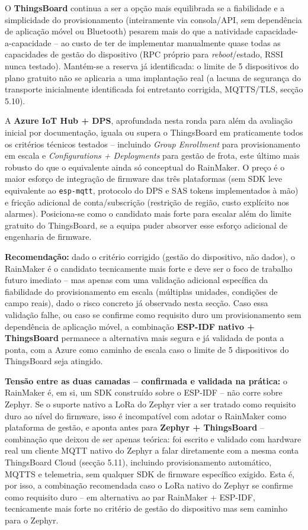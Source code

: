 \documentclass[a4paper,12pt]{article}
\begin{document}
O \textbf{ThingsBoard} continua a ser a opção mais equilibrada se a fiabilidade e a simplicidade do provisionamento (inteiramente via consola/API, sem dependência de aplicação móvel ou Bluetooth) pesarem mais do que a natividade capacidade-a-capacidade -- ao custo de ter de implementar manualmente quase todas as capacidades de gestão do dispositivo (RPC próprio para \textit{reboot}/estado, RSSI nunca testado). Mantém-se a reserva já identificada: o limite de 5 dispositivos do plano gratuito não se aplicaria a uma implantação real (a lacuna de segurança do transporte inicialmente identificada foi entretanto corrigida, MQTTS/TLS, secção 5.10).

A \textbf{Azure IoT Hub + DPS}, aprofundada nesta ronda para além da avaliação inicial por documentação, iguala ou supera o ThingsBoard em praticamente todos os critérios técnicos testados -- incluindo \textit{Group Enrollment} para provisionamento em escala e \textit{Configurations + Deployments} para gestão de frota, este último mais robusto do que o equivalente ainda só conceptual do RainMaker. O preço é o maior esforço de integração de firmware das três plataformas (sem SDK leve equivalente ao \texttt{esp-mqtt}, protocolo do DPS e SAS tokens implementados à mão) e fricção adicional de conta/subscrição (restrição de região, custo explícito nos alarmes). Posiciona-se como o candidato mais forte para escalar além do limite gratuito do ThingsBoard, se a equipa puder absorver esse esforço adicional de engenharia de firmware.

\textbf{Recomendação:} dado o critério corrigido (gestão do dispositivo, não dados), o RainMaker é o candidato tecnicamente mais forte e deve ser o foco de trabalho futuro imediato -- mas apenas com uma validação adicional específica da fiabilidade do provisionamento em escala (múltiplas unidades, condições de campo reais), dado o risco concreto já observado nesta secção. Caso essa validação falhe, ou caso se confirme como requisito duro um provisionamento sem dependência de aplicação móvel, a combinação \textbf{ESP-IDF nativo + ThingsBoard} permanece a alternativa mais segura e já validada de ponta a ponta, com a Azure como caminho de escala caso o limite de 5 dispositivos do ThingsBoard seja atingido.

\textbf{Tensão entre as duas camadas -- confirmada e validada na prática:} o RainMaker é, em si, um SDK construído sobre o ESP-IDF -- não corre sobre Zephyr. Se o suporte nativo a LoRa do Zephyr vier a ser tratado como requisito duro ao nível do firmware, isso é incompatível com adotar o RainMaker como plataforma de gestão, e aponta antes para \textbf{Zephyr + ThingsBoard} -- combinação que deixou de ser apenas teórica: foi escrito e validado com hardware real um cliente MQTT nativo do Zephyr a falar diretamente com a mesma conta ThingsBoard Cloud (secção 5.11), incluindo provisionamento automático, MQTTS e telemetria, sem qualquer SDK de firmware específico exigido. Esta é, por isso, a combinação recomendada caso o LoRa nativo do Zephyr se confirme como requisito duro -- em alternativa ao par RainMaker + ESP-IDF, tecnicamente mais forte no critério de gestão do dispositivo mas sem caminho para o Zephyr.
\end{document}

